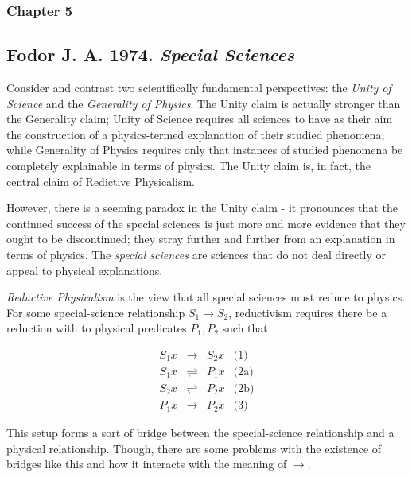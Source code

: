 \documentclass{article}
\newcommand{\tx}[1]{\text{#1}}
\newcommand{\ti}[1]{\textit{#1}}
\newcommand{\annbibtitle}[2]{\subsection*{#1. \ti{#2}}}
\begin{document}
\subsubsection*{Chapter 5}



\annbibtitle{Fodor J. A. 1974}{Special Sciences}

Consider and contrast two scientifically fundamental perspectives: the \ti{Unity of Science} and the \ti{Generality of Physics}. The Unity claim is actually stronger than the Generality claim; Unity of Science requires all sciences to have as their aim the construction of a physics-termed explanation of their studied phenomena, while Generality of Physics requires only that instances of studied phenomena be completely explainable in terms of physics. The Unity claim is, in fact, the central claim of Redictive Physicalism.

However, there is a seeming paradox in the Unity claim - it pronounces that the continued success of the special sciences is just more and more evidence that they ought to be discontinued; they stray further and further from an explanation in terms of physics. The \ti{special sciences} are sciences that do not deal directly or appeal to physical explanations.

\ti{Reductive Physicalism} is the view that all special sciences must reduce to physics. For some special-science relationship $S_1 \rightarrow S_2$, reductivism requires there be a reduction with to physical predicates $P_1, P_2$ such that

$$
\begin{array}{rcll}
    S_1 x & \rightarrow & S_2 x & \tx{(1)} \\
    S_1 x & \rightleftharpoons & P_1 x & \tx{(2a)} \\
    S_2 x & \rightleftharpoons & P_2 x & \tx{(2b)} \\
    P_1 x & \rightarrow & P_2 x & \tx{(3)}
\end{array}
$$

This setup forms a sort of bridge between the special-science relationship and a physical relationship. Though, there are some problems with the existence of bridges like this and how it interacts with the meaning of $\rightarrow$.
\end{document}
